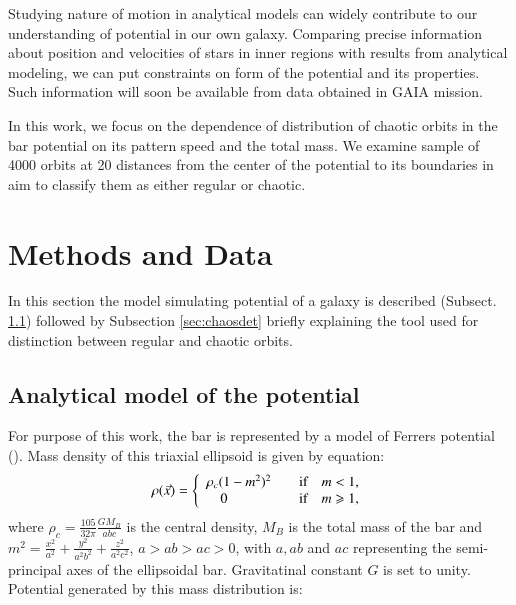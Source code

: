 \documentclass[a4paper,fleqn,usenatbib]{mnras}
\begin{document}
Studying nature of motion in analytical models can widely contribute to our understanding of potential in our own galaxy. Comparing precise information about position and velocities of stars in inner regions with results from analytical modeling, we can put constraints on form of the potential and its properties. Such information will soon be available from data obtained in GAIA mission.

In this work, we focus on the dependence of distribution of chaotic orbits in the bar potential on its pattern speed and the total mass. We examine sample of 4000 orbits at 20 distances from the center of the potential to its boundaries in aim to classify them as either regular or chaotic.

\section{Methods and Data}

In this section the model simulating potential of a galaxy is described (Subsect. \ref{sec:potential}) followed by Subsection \ref{sec:chaosdet} briefly explaining the tool used for distinction between regular and chaotic orbits.

\subsection{Analytical model of the potential}
\label{sec:potential} %

For purpose of this work, the bar is represented by a model of Ferrers potential (\cite{Ferrers:1877}). Mass density of this triaxial ellipsoid is given by equation:
\begin{equation} \label{eq:Ferdens}
\rho(\vec{x}) = \left\{
\begin{array}{l l}
\rho_{c}(1-m^{2})^{2}& \quad \textrm{if} \quad m<1,\\
\quad 0& \quad \textrm{if} \quad m \geq 1,\\
\end{array} \right.
\end{equation}
where $\rho_{c}=\frac{105}{32\pi}\frac{G M_{B}}{abc}$ is the central
density, $M_{B}$ is the total mass of the bar and
$m^{2}=\frac{x^{2}}{a^{2}}+\frac{y^{2}}{a^2b^{2}}+\frac{z^{2}}{a^2c^{2}}$,
\mbox{$a>ab>ac> 0$}, with $a,ab$ and $ac$ representing the semi-principal axes of the ellipsoidal
bar. Gravitatinal constant $ G $ is set to unity. Potential generated by this mass distribution is:
\end{document}
